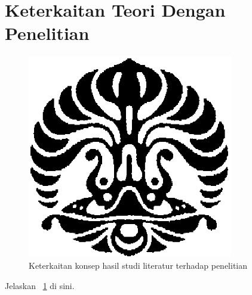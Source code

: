 \section{Keterkaitan Teori Dengan Penelitian}
\begin{figure}
	\centering
	\includegraphics[width=0.8\textwidth]{pics/makara.png}
	\caption{Keterkaitan konsep hasil studi literatur terhadap penelitian}
	\label{fig:research_concept_map}
\end{figure}

Jelaskan \pic~\ref{fig:research_concept_map} di sini.
